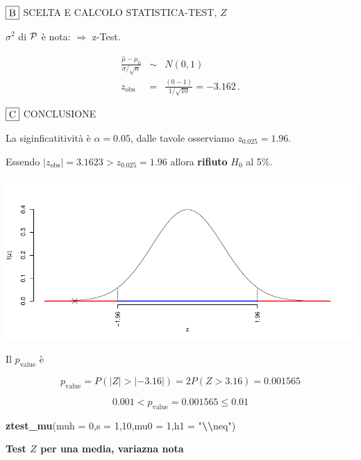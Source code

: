 \documentclass[
  11pt,
]{book}
\newenvironment{Shaded}{\begin{snugshade}}{\end{snugshade}}
\newcommand{\AttributeTok}[1]{\textcolor[rgb]{0.13,0.29,0.53}{#1}}
\newcommand{\DecValTok}[1]{\textcolor[rgb]{0.00,0.00,0.81}{#1}}
\newcommand{\FunctionTok}[1]{\textcolor[rgb]{0.13,0.29,0.53}{\textbf{#1}}}
\newcommand{\NormalTok}[1]{#1}
\newcommand{\SpecialCharTok}[1]{\textcolor[rgb]{0.81,0.36,0.00}{\textbf{#1}}}
\newcommand{\StringTok}[1]{\textcolor[rgb]{0.31,0.60,0.02}{#1}}
\theoremstyle{mytheoremstyle}
\theoremstyle{mydefstyle}
\begin{document}
\(\fbox{B}\) SCELTA E CALCOLO STATISTICA-TEST, \(Z\)

\(\sigma^{2}\) di \(\cal{P}\) è nota: \(\Rightarrow\) z-Test.

\begin{eqnarray*}
   \frac{\hat\mu - \mu_{0}} {\sigma/\sqrt{n}}&\sim&N(0,1)\\
   z_{\text{obs}}
   &=& \frac{ ( 0 -  1 )} { 1 /\sqrt{ 10 }}
   =   -3.162 \, .
   \end{eqnarray*}

\(\fbox{C}\) CONCLUSIONE

La siginficatitività è \(\alpha=0.05\), dalle tavole osserviamo \(z_{0.025}=1.96\).

Essendo \(|z_\text{obs}|=3.1623>z_{0.025}=1.96\) allora \textbf{rifiuto} \(H_0\) al 5\%.

\begin{center}\includegraphics{Appunti_di_Statistica_2025_files/figure-latex/25-test-functions-10-1} \end{center}

Il \(p_{\text{value}}\) è

\[ p_{\text{value}} = P(|Z|>|-3.16|)=2P(Z>3.16)=0.001565 \]

\[
 0.001 < p_\text{value}= 0.001565 \leq 0.01 
\]

\begin{Shaded}
\begin{Highlighting}[]
\FunctionTok{ztest\_mu}\NormalTok{(}\AttributeTok{muh =} \DecValTok{0}\NormalTok{,}\AttributeTok{s =} \DecValTok{1}\NormalTok{,}\DecValTok{10}\NormalTok{,}\AttributeTok{mu0 =} \DecValTok{1}\NormalTok{,}\AttributeTok{h1 =} \StringTok{"}\SpecialCharTok{\textbackslash{}\textbackslash{}}\StringTok{neq"}\NormalTok{)}
\end{Highlighting}
\end{Shaded}

\textbf{Test \(Z\) per una media, variazna nota}
\end{document}
